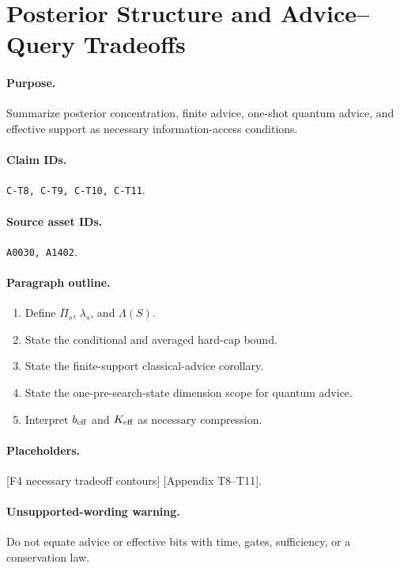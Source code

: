 \section{Posterior Structure and Advice--Query Tradeoffs}

\paragraph{Purpose.}
Summarize posterior concentration, finite advice, one-shot quantum advice, and
effective support as necessary information-access conditions.

\paragraph{Claim IDs.}
\texttt{C-T8, C-T9, C-T10, C-T11}.

\paragraph{Source asset IDs.}
\texttt{A0030, A1402}.

\paragraph{Paragraph outline.}
\begin{enumerate}
  \item Define $\overline\Pi_s$, $\lambda_s$, and $\Lambda(S)$.
  \item State the conditional and averaged hard-cap bound.
  \item State the finite-support classical-advice corollary.
  \item State the one-pre-search-state dimension scope for quantum advice.
  \item Interpret $b_{\rm eff}$ and $K_{\rm eff}$ as necessary compression.
\end{enumerate}

\paragraph{Placeholders.}
[F4 necessary tradeoff contours] [Appendix T8--T11].

\paragraph{Unsupported-wording warning.}
Do not equate advice or effective bits with time, gates, sufficiency, or a
conservation law.
